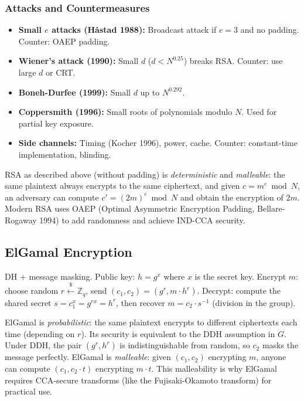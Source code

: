 \subsubsection*{Attacks and Countermeasures}
\begin{itemize}
\item \textbf{Small $e$ attacks (Håstad 1988):} Broadcast attack if $e=3$ and no padding. Counter: OAEP padding.
\item \textbf{Wiener's attack (1990):} Small $d$ ($d < N^{0.25}$) breaks RSA. Counter: use large $d$ or CRT.
\item \textbf{Boneh-Durfee (1999):} Small $d$ up to $N^{0.292}$.
\item \textbf{Coppersmith (1996):} Small roots of polynomials modulo $N$. Used for partial key exposure.
\item \textbf{Side channels:} Timing (Kocher 1996), power, cache. Counter: constant-time implementation, blinding.
\end{itemize}

RSA as described above (without padding) is \emph{deterministic} and \emph{malleable}: the same plaintext always encrypts to the same ciphertext, and given $c = m^e \bmod N$, an adversary can compute $c' = (2m)^e \bmod N$ and obtain the encryption of $2m$. Modern RSA uses OAEP (Optimal Asymmetric Encryption Padding, Bellare-Rogaway 1994) to add randomness and achieve IND-CCA security.

\subsection{ElGamal Encryption}
\label{sec:crypto:elgamal}

DH + message masking. Public key: $h = g^x$ where $x$ is the secret key. Encrypt $m$: choose random $r \stackrel{\$}{\gets} \mathbb{Z}_q$, send $(c_1, c_2) = (g^r, m \cdot h^r)$. Decrypt: compute the shared secret $s = c_1^x = g^{rx} = h^r$, then recover $m = c_2 \cdot s^{-1}$ (division in the group).

ElGamal is \emph{probabilistic}: the same plaintext encrypts to different ciphertexts each time (depending on $r$). Its security is equivalent to the DDH assumption in $G$. Under DDH, the pair $(g^r, h^r)$ is indistinguishable from random, so $c_2$ masks the message perfectly. ElGamal is \emph{malleable}: given $(c_1, c_2)$ encrypting $m$, anyone can compute $(c_1, c_2 \cdot t)$ encrypting $m \cdot t$. This malleability is why ElGamal requires CCA-secure transforms (like the Fujisaki-Okamoto transform) for practical use.

